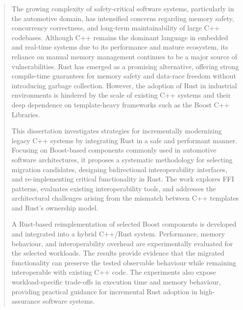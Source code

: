 \begin{abstract}

The growing complexity of safety-critical software systems, particularly in the automotive domain,
has intensified concerns regarding memory safety, concurrency correctness,
and long-term maintainability of large C++ codebases. Although C++ remains the dominant language in embedded and
real-time systems due to its performance and mature ecosystem,
its reliance on manual memory management continues to be a major source of vulnerabilities.
Rust has emerged as a promising alternative, offering strong compile-time guarantees for memory safety
and data-race freedom without introducing garbage collection.
However, the adoption of Rust in industrial environments is hindered by the scale of existing C++ systems
and their deep dependence on template-heavy frameworks such as the Boost C++ Libraries.

This dissertation investigates strategies for incrementally modernizing legacy C++ systems by integrating Rust in a safe
and performant manner. Focusing on Boost-based components commonly used in automotive software architectures,
it proposes a systematic methodology for selecting migration candidates, designing bidirectional interoperability interfaces,
and re-implementing critical functionality in Rust. The work explores \gls{FFI} patterns,
evaluates existing interoperability tools, and addresses the architectural challenges arising from the mismatch
between C++ templates and Rust's ownership model.

A Rust-based reimplementation of selected Boost components is developed and integrated into a hybrid C++/Rust system.
Performance, memory behaviour, and interoperability overhead are experimentally evaluated for the selected workloads.
The results provide evidence that the migrated functionality can preserve the tested observable behaviour while remaining
interoperable with existing C++ code. The experiments also expose workload-specific trade-offs in execution time and
memory behaviour, providing practical guidance for incremental Rust adoption in high-assurance software systems.

\end{abstract}

